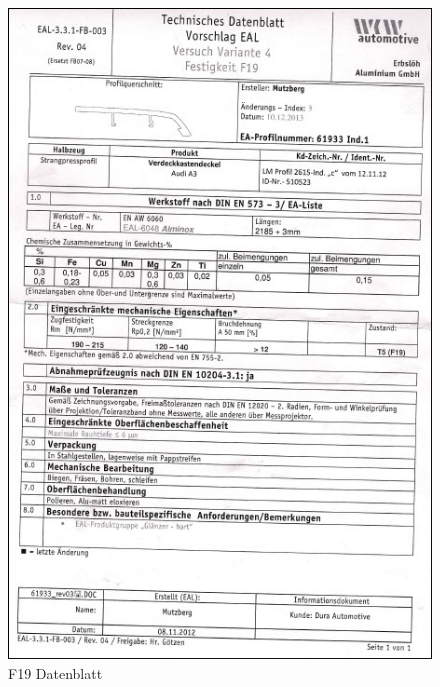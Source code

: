 \documentclass[12pt,a4paper,parskip]{scrartcl}
\begin{document}
\begin{figure}[hbtp]
\centering
\includegraphics[width=1\textwidth]{F19Datenblatt.jpg}
\caption{F19 Datenblatt}
\end{figure}
\end{document}

